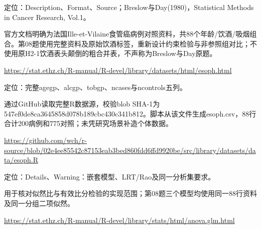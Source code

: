 \par\noindent\begin{minipage}{\linewidth}\raggedright{}\label{src:G2-ESOPH}
\par
定位：Description、Format、Source；Breslow与Day(1980)，Statistical Methods in Cancer Research, Vol.1。\par
官方文档明确为法国Ille-et-Vilaine食管癌病例对照资料，共88个年龄/饮酒/吸烟组合。第08题使用完整资料及原始饮酒标签，重新设计约束检验与非参照组对比；不使用原H2-1饮酒表头颠倒的粗合并表，不声称为Breslow与Day原题。\par
{\small \url{https://stat.ethz.ch/R-manual/R-devel/library/datasets/html/esoph.html}}\par
\end{minipage}\par\medskip

\par\noindent\begin{minipage}{\linewidth}\raggedright{}\label{src:G2-ESOPH-DATA}
\par
定位：完整agegp、alcgp、tobgp、ncases与ncontrols五列。\par
通过GitHub读取完整R数据源，校验blob SHA-1为547ef0de8ca3645858d078b189cbc430c341b812。脚本从该文件生成esoph.csv，88行合计200病例和775对照；未凭研究场景补造个体数据。\par
{\small \url{https://github.com/wch/r-source/blob/02e4ee85542c87153eab3bed860fdd6ffd9920be/src/library/datasets/data/esoph.R}}\par
\end{minipage}\par\medskip

\par\noindent\begin{minipage}{\linewidth}\raggedright{}\label{src:G2-ANOVA}
\par
定位：Details、Warning：嵌套模型、LRT/Rao及同一分析集要求。\par
用于核对似然比与有效比分检验的实现范围；第08题三个模型均使用同一88行资料及同一分组二项似然。\par
{\small \url{https://stat.ethz.ch/R-manual/R-devel/library/stats/html/anova.glm.html}}\par
\end{minipage}\par\medskip

